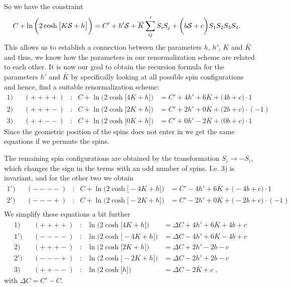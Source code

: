 So we have the constraint
%
\begin{align}\label{eq:constr}
C + \ln\bigg(2\cosh\big[K{\cal S} +h  \big]  \bigg)&=
C' + h' {\cal S} + \overline K \sum'_{ij} S_{i}S_{j}  +
\bigg(b{\cal S} + c\bigg) S_{1}S_{2}S_{3}S_{4} .
\end{align}
%
This allows us to establish a connection between the parameters $h$, $h'$, $K$ and $\bar{K}$ and thus, we know how the parameters in our renormalization scheme are related to each other. It is now our goal to obtain the recursion formula for the parameters $h'$ and $\bar{K}$ by specifically looking at all possible spin configurations and hence, find a suitable renormalization scheme:
%
\begin{align*}
1)&&(++++)&:&C + \ln\bigg(2\cosh\big[4 K+h  \big]  \bigg) &=
C' + 4 h'  + 6 \overline K   + \big(4b+c\big)\cdot 1 \\
2)&&(+++-)&:&C + \ln\bigg(2\cosh\big[2 K+h  \big]  \bigg) &=
C' + 2 h'  + 0 \overline K   + \big(2b+c\big)\cdot (-1) \\
3)&&(++--)&:&C + \ln\bigg(2\cosh\big[0K+h  \big]  \bigg) &=
C' + 0 h'  - 2 \overline K   + \big(0b+c\big)\cdot 1 \;
\end{align*}
%
Since the geometric position of the spins does not enter in  we get the same equations if we permute the spins.

%
The remaining spin configurations
are obtained by the transformation $S_{i}\to - S_{i}$, which changes the sign in the terms with an odd number of spins. I.e. 3) is invariant, and for the other two we obtain
\begin{align*}
1')&&(----)&:&C + \ln\bigg(2\cosh\big[-4 K+h  \big]  \bigg) &=
C' - 4 h'  + 6 \overline K   + \big(-4b+c\big)\cdot 1 \\
2')&&(---+)&:&C + \ln\bigg(2\cosh\big[-2 K+h  \big]  \bigg) &=
C' - 2 h'  + 0 \overline K   + \big(-2b+c\big)\cdot (-1) \\
\end{align*}
%
We simplify these equations a bit further
\begin{align*}
1)&&(++++)&:& \ln\bigg(2\cosh\big[4 K+h  \big]  \bigg) &=
\Delta C + 4 h'  + 6 \overline K   + 4b+c \\
1')&&(----)&:& \ln\bigg(2\cosh\big[-4 K+h  \big]  \bigg) &=
\Delta C  - 4 h'  + 6 \overline K   -4b+c \\
2)&&(+++-)&:&\ln\bigg(2\cosh\big[2 K+h  \big]  \bigg) &=
\Delta C + 2 h'   - 2b-c \\
2')&&(---+)&:&\ln\bigg(2\cosh\big[-2 K+h  \big]  \bigg) &=
\Delta C - 2 h'     + 2b-c\\
3)&&(++--)&:& \ln\bigg(2\cosh\big[h  \big]  \bigg) &=
\Delta C - 2 \overline K   + c \;,
\end{align*}
%
with $\Delta C = C'-C$. 


